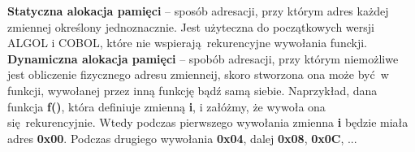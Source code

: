 	\textbf{Statyczna alokacja pamięci} -- sposób adresacji, przy którym adres każdej zmiennej określony
	jednoznacznie. Jest użyteczna do początkowych wersji ALGOL i COBOL, które nie wspierają rekurencyjne
	wywołania funckji.
	\\
	
	\textbf{Dynamiczna alokacja pamięci} -- spobób adresacji, przy którym niemożliwe jest obliczenie
	fizycznego adresu zmienneij, skoro stworzona ona może być w funkcji, wywołanej przez inną funkcję
	bądź samą siebie. Naprzykład, dana funkcja \textbf{f()}, która definiuje zmienną \textbf{i}, i
	załóżmy, że wywoła ona się rekurencyjnie. Wtedy podczas pierwszego wywołania zmienna \textbf{i}
	będzie miała adres \textbf{0x00}. Podczas drugiego wywołania \textbf{0x04}, dalej \textbf{0x08},
	\textbf{0x0C}, ...

